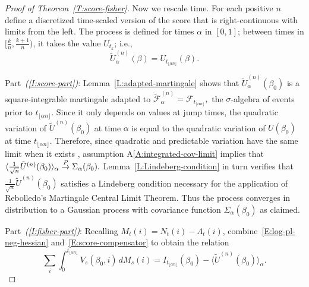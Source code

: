 \documentclass[final]{statsoc}
\begin{document}
\begin{proof}[Proof of Theorem~\ref{T:score-fisher}]
Now we rescale time.  For each positive $n$ define a discretized time-scaled
version of the score that is right-continuous with limits from the left.
The process is defined for times $\alpha$ in $[0,1]$; between times in
$[\tfrac{k}{n}, \tfrac{k+1}{n})$, it takes the value $U_{t_k}$; i.e.,
\begin{equation}\label{E:score-time-scaled}
    \tilde U_{\alpha}^{(n)}(\beta)
        = U_{t_{\lfloor \alpha n \rfloor}}(\beta).
\end{equation}

Part~\textit{(\ref{I:score-part})}:
Lemma~\ref{L:adapted-martingale} shows that $\tilde U_\alpha^{(n)}(\beta_0)$
is a square-integrable martingale adapted to
\(
    \mathcal{\tilde F}^{(n)}_\alpha
        =
        \mathcal{F}_{t_{\lfloor \alpha n \rfloor}},
\)
the $\sigma$-algebra of events prior to
$t_{\lfloor \alpha n \rfloor}$.
Since it only depends on values at jump times, the
quadratic variation of $\tilde U^{(n)}(\beta_0)$ at time $\alpha$ is
equal to the quadratic variation of $U(\beta_0)$ at time
$t_{\lfloor \alpha n \rfloor}$.  Therefore, since quadratic and
predictable variation have the same limit when it exists
\citep[Prop.~1]{rebolledo1980central}, assumption
A\ref{A:integrated-cov-limit} implies that
\(
    \langle \frac{1}{\sqrt{n}} \tilde U^{(n)}(\beta_0) \rangle_\alpha
        \overset{\mathit{P}}{\to}
            \Sigma_\alpha(\beta_0).
\)
Lemma~\ref{L:Lindeberg-condition} in turn verifies that
$\frac{1}{\sqrt{n}} \tilde U^{(n)}(\beta_0)$ satisfies a Lindeberg
condition necessary for the application of Rebolledo's \citeyearpar{rebolledo1980central} Martingale Central
Limit Theorem.  Thus the process converges in
distribution to a Gaussian process with covariance function
$\Sigma_\alpha(\beta_0)$ as claimed.

Part~\textit{(\ref{I:fisher-part})}:
Recalling $M_t(i) = N_t(i) - \Lambda_t(i)$,
combine~\eqref{E:log-pl-neg-hessian} and~\eqref{E:score-compensator}
to obtain the relation
\begin{equation}\label{E:var-estimate-relation}
            \sum_i
            \int_0^{t_{\lfloor \alpha n \rfloor}}
                V_s(\beta_0, i) \, dM_s(i)
        =
            I_{t_{\lfloor \alpha n \rfloor}}(\beta_0)
        -
            \big\langle \tilde U^{(n)}(\beta_0) \big\rangle_\alpha.
\end{equation}


\end{proof}
\end{document}
